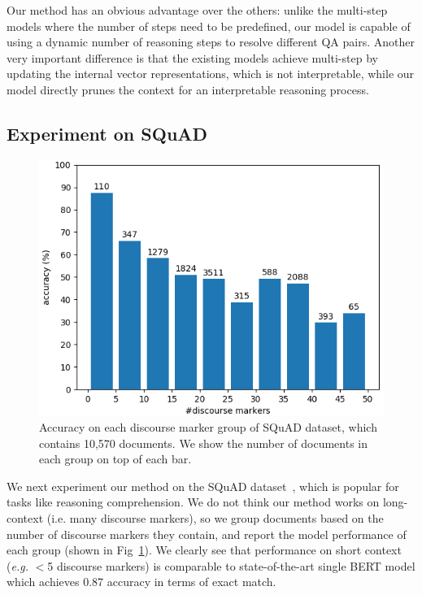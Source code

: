 Our method has an obvious advantage over the others: unlike the multi-step models where the number of steps need to be predefined, our model is capable of using a dynamic number of reasoning steps to resolve different QA pairs. Another very important difference is that the existing models achieve multi-step by updating the internal vector representations, which is not interpretable, while our model directly prunes the context for an interpretable reasoning process.

\subsection{Experiment on SQuAD}

\begin{figure}
 \centering
 \includegraphics[width=0.9\linewidth]{fig/squad.png}
 \caption{Accuracy on each discourse marker group of SQuAD dataset, which contains 10,570 documents. We show the number of documents in each group on top of each bar.}
 \label{fig:squad}
\vspace{-2ex}
\end{figure}


We next experiment our method on the SQuAD dataset~\cite{DBLP:conf/emnlp/RajpurkarZLL16}, which is popular for tasks like reasoning comprehension. We do not think our method works on long-context (i.e. many discourse markers), so we group documents based on the number of discourse markers they contain, and report the model performance of each group (shown in Fig~\ref{fig:squad}). We clearly see  that performance on short context (\emph{e.g.} $<$5 discourse markers) is comparable to state-of-the-art single BERT model \cite{DBLP:journals/corr/abs-1810-04805} which achieves 0.87 accuracy in terms of exact match. 


